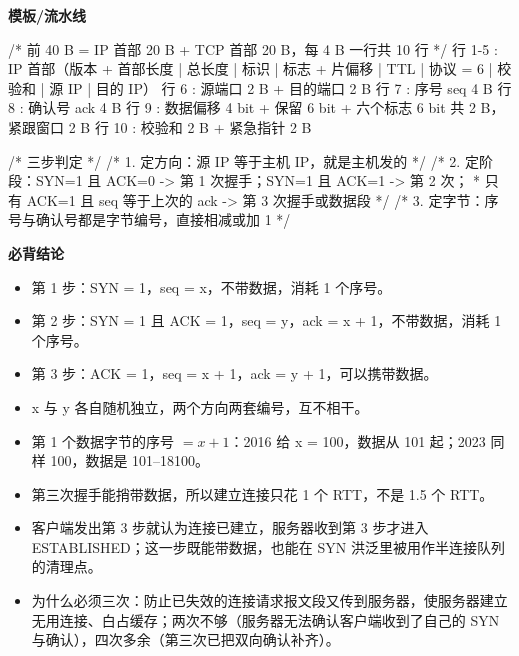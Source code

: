 \documentclass[10pt,a4paper]{ctexart}
\begin{document}
\textbf{模板/流水线}

\begin{codebox}
/* 前 40 B = IP 首部 20 B + TCP 首部 20 B，每 4 B 一行共 10 行 */
行 1-5 : IP 首部（版本 + 首部长度 | 总长度 | 标识 | 标志 + 片偏移 | TTL | 协议 = 6 | 校验和 | 源 IP | 目的 IP）
行 6   : 源端口 2 B + 目的端口 2 B
行 7   : 序号 seq 4 B
行 8   : 确认号 ack 4 B
行 9   : 数据偏移 4 bit + 保留 6 bit + 六个标志 6 bit 共 2 B，紧跟窗口 2 B
行 10  : 校验和 2 B + 紧急指针 2 B

/* 三步判定 */
/* 1. 定方向：源 IP 等于主机 IP，就是主机发的 */
/* 2. 定阶段：SYN=1 且 ACK=0 -> 第 1 次握手；SYN=1 且 ACK=1 -> 第 2 次；
 *            只有 ACK=1 且 seq 等于上次的 ack -> 第 3 次握手或数据段 */
/* 3. 定字节：序号与确认号都是字节编号，直接相减或加 1 */
\end{codebox}




\textbf{必背结论}

\begin{itemize}

\item 第 1 步：SYN = 1，seq = x，不带数据，消耗 1 个序号。

\item 第 2 步：SYN = 1 且 ACK = 1，seq = y，ack = x + 1，不带数据，消耗 1 个序号。

\item 第 3 步：ACK = 1，seq = x + 1，ack = y + 1，可以携带数据。

\item x 与 y 各自随机独立，两个方向两套编号，互不相干。

\item 第 1 个数据字节的序号 $=x+1$：2016 给 x = 100，数据从 101 起；2023 同样 100，数据是 101–18100。

\item 第三次握手能捎带数据，所以建立连接只花 1 个 RTT，不是 1.5 个 RTT。

\item 客户端发出第 3 步就认为连接已建立，服务器收到第 3 步才进入 ESTABLISHED；这一步既能带数据，也能在 SYN 洪泛里被用作半连接队列的清理点。

\item 为什么必须三次：防止已失效的连接请求报文段又传到服务器，使服务器建立无用连接、白占缓存；两次不够（服务器无法确认客户端收到了自己的 SYN 与确认），四次多余（第三次已把双向确认补齐）。

\end{itemize}
\end{document}
